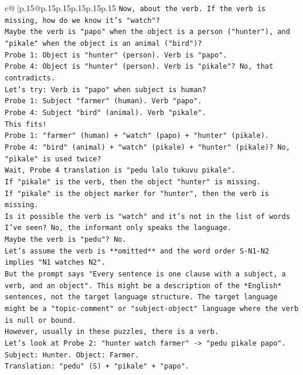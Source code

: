 \documentclass{article}
\begin{document}
{\begin{supertabular}{c@{$\;$}|p{.15\linewidth}@{}p{.15\linewidth}p{.15\linewidth}p{.15\linewidth}p{.15\linewidth}p{.15\linewidth}}
{{{\texttt{Now, about the verb. If the verb is missing, how do we know it's "watch"?} \\
\texttt{Maybe the verb is "papo" when the object is a person ("hunter"), and "pikale" when the object is an animal ("bird")?} \\
\texttt{Probe 1: Object is "hunter" (person). Verb is "papo".} \\
\texttt{Probe 4: Object is "hunter" (person). Verb is "pikale"? No, that contradicts.} \\
\texttt{Let's try: Verb is "papo" when subject is human?} \\
\texttt{Probe 1: Subject "farmer" (human). Verb "papo".} \\
\texttt{Probe 4: Subject "bird" (animal). Verb "pikale".} \\
\texttt{This fits!} \\
\texttt{Probe 1: "farmer" (human) + "watch" (papo) + "hunter" (pikale).} \\
\texttt{Probe 4: "bird" (animal) + "watch" (pikale) + "hunter" (pikale)? No, "pikale" is used twice?} \\
\texttt{Wait, Probe 4 translation is "pedu lalo tukuvu pikale".} \\
\texttt{If "pikale" is the verb, then the object "hunter" is missing.} \\
\texttt{If "pikale" is the object marker for "hunter", then the verb is missing.} \\
\texttt{Is it possible the verb is "watch" and it's not in the list of words I've seen? No, the informant only speaks the language.} \\
\texttt{Maybe the verb is "pedu"? No.} \\
\texttt{Let's assume the verb is **omitted** and the word order S{-}N1{-}N2 implies "N1 watches N2".} \\
\texttt{But the prompt says "Every sentence is one clause with a subject, a verb, and an object". This might be a description of the *English* sentences, not the target language structure. The target language might be a "topic{-}comment" or "subject{-}object" language where the verb is null or bound.} \\
\texttt{However, usually in these puzzles, there is a verb.} \\
\texttt{Let's look at Probe 2: "hunter watch farmer" {-}> "pedu pikale papo".} \\
\texttt{Subject: Hunter. Object: Farmer.} \\
\texttt{Translation: "pedu" (S) + "pikale" + "papo".} \\
}}}
\end{supertabular}}
\end{document}
